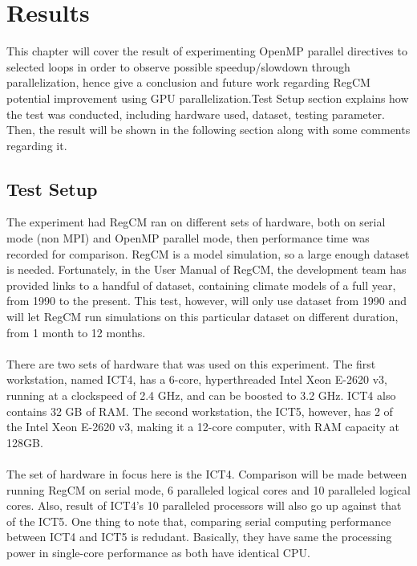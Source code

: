 \chapter{Results}

This chapter will cover the result of experimenting OpenMP parallel directives to selected loops in order to observe possible speedup/slowdown through parallelization, hence give a conclusion and future work regarding RegCM potential improvement using GPU parallelization.Test Setup section explains how the test was conducted, including hardware used, dataset, testing parameter. Then, the result will be shown in the following section along with some comments regarding it. \\

\section{Test Setup}

The experiment had RegCM ran on different sets of hardware, both on serial mode (non MPI) and OpenMP parallel mode, then performance time was recorded for comparison. RegCM is a model simulation, so a large enough dataset is needed. Fortunately, in the User Manual of RegCM, the development team has provided links to a handful of dataset, containing climate models of a full year, from 1990 to the present. This test, however, will only use dataset from 1990 and will let RegCM run simulations on this particular dataset on different duration, from 1 month to 12 months. \\
~\\
There are two sets of hardware that was used on this experiment. The first workstation, named ICT4, has a 6-core, hyperthreaded Intel Xeon E-2620 v3, running at a clockspeed of 2.4 GHz, and can be boosted to 3.2 GHz. ICT4 also contains 32 GB of RAM. The second workstation, the ICT5, however, has 2 of the Intel Xeon E-2620 v3, making it a 12-core computer, with RAM capacity at 128GB. \\
~\\
The set of hardware in focus here is the ICT4. Comparison will be made between running RegCM on serial mode, 6 paralleled logical cores and 10 paralleled logical cores. Also, result of ICT4's 10 paralleled processors will also go up against that of the ICT5. One thing to note that, comparing serial computing performance between ICT4 and ICT5 is redudant. Basically, they have same the processing power in single-core performance as both have identical CPU. \\

